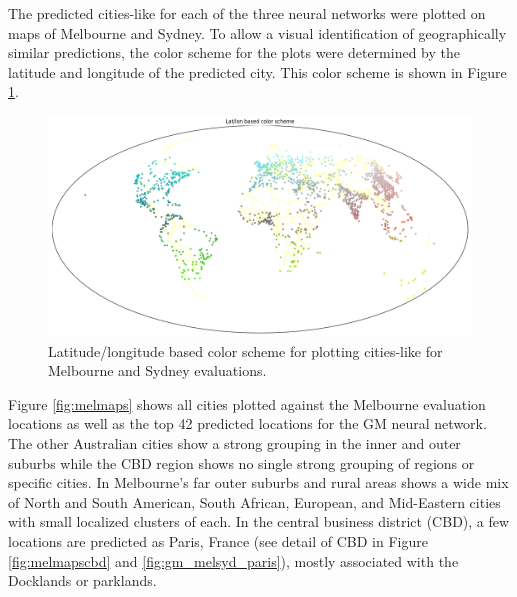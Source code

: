 \documentclass[sageh,times]{sagej}
\begin{document}
The predicted cities-like for each of the three neural networks were plotted on maps of Melbourne and Sydney. To allow a visual identification of geographically similar predictions, the color scheme for the plots were determined by the latitude and longitude of the predicted city. This color scheme is shown in Figure \ref{fig:colorscheme}. 


\begin{figure}[!htbp]
\centering    
\includegraphics[scale=0.25]{Images/World_map_color_scheme.png} 
\caption{Latitude/longitude based color scheme for plotting cities-like for Melbourne and Sydney evaluations.}    
 \label{fig:colorscheme}  
\end{figure} 


Figure \ref{fig:melmaps} shows all cities plotted against the Melbourne evaluation locations as well as the top 42 predicted locations for the GM neural network. The other Australian cities show a strong grouping in the inner and outer suburbs while the CBD region shows no single strong grouping of regions or specific cities. In Melbourne's far outer suburbs and rural areas shows a wide mix of North and South American, South African, European, and Mid-Eastern cities with small localized clusters of each. In the central business district (CBD), a few locations are predicted as Paris, France (see detail of CBD in Figure \ref{fig:melmapscbd} and \ref{fig:gm_melsyd_paris}), mostly associated with the Docklands or parklands.
\end{document}
